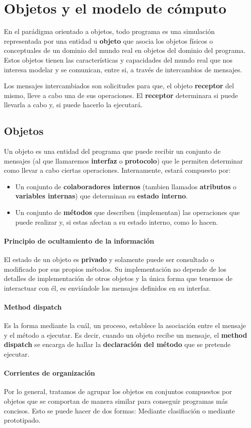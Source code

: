 \section{Objetos y el modelo de cómputo}

En el parádigma orientado a objetos, todo programa es una simulación representada por una entidad u \textbf{objeto} que asocia los objetos físicos o conceptuales de un dominio del mundo real en objetos del dominio del programa. Estos objetos tienen las características y capacidades del mundo real que nos interesa modelar y se comunican, entre si, a través de intercambios de mensajes.

Los mensajes intercambiados son solicitudes para que, el objeto \textbf{receptor} del mismo, lleve a cabo una de sus operaciones. El \textbf{receptor} determinara si puede llevarla a cabo y, si puede hacerlo la ejecutará.

\subsection{Objetos}
Un objeto es una entidad del programa que puede recibir un conjunto de mensajes (al que llamaremos \textbf{interfaz} o \textbf{protocolo}) que le permiten determinar como llevar a cabo ciertas operaciones. Internamente, estará compuesto por: 
\begin{itemize}
	\item Un conjunto de \textbf{colaboradores internos} (tambien llamados \textbf{atributos} o \textbf{variables internas}) que determinan su \textbf{estado interno}.
	\item Un conjunto de \textbf{métodos} que describen (implementan) las operaciones que puede realizar y, si estas afectan a su estado interno, como lo hacen.
\end{itemize}

\paragraph{Principio de ocultamiento de la información}
El estado de un objeto es \textbf{privado} y solamente puede ser consultado o modificado por sus propios métodos. Su implementación no depende de los detalles de implementación de otros objetos y la única forma que tenemos de interactuar con él, es enviándole los mensajes definidos en su interfaz.

\paragraph{Method dispatch} Es la forma mediante la cuál, un proceso, establece la asociación entre el mensaje y el método a ejecutar. Es decir, cuando un objeto recibe un mensaje, el \textbf{method dispatch} se encarga de hallar la \textbf{declaración del método} que se pretende ejecutar.

\paragraph{Corrientes de organización}
Por lo general, tratamos de agrupar los objetos en conjuntos compuestos por objetos que se comportan de manera similar para conseguir programas más concisos. Esto se puede hacer de dos formas: Mediante clasifiación o mediante prototipado.